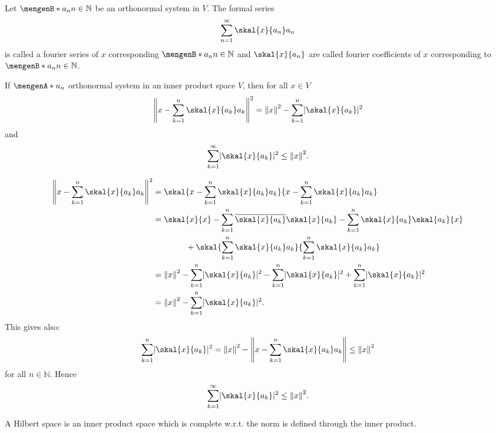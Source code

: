 \begin{definition}
	Let $\set[a_n]{n \in \mathbb{N}}$ be an orthonormal system in $V$. The formal series 
	\[
		\sum_{n=1}^{\infty} \skal{x}{a_n}a_n
	\]
	is called a fourier series of $x$ corresponding $\set[a_n]{n \in \mathbb{N}}$ and $\skal{x}{a_n}$ are called fourier coefficients of $x$ corresponding to $\set[a_n]{n \in \mathbb{N}}$. 
\end{definition}

\begin{theorem}
	If $\set{u_n}$ orthonormal system in an inner product space $V$, then for all $x \in V$
	\[
		\norm{x- \sum_{k=1}^{n} \skal{x}{a_k}a_k}^2 = \norm{x}^2 - \sum_{k=1}^{n} \abs{\skal{x}{a_k}}^2
	\]
	and 
	\[
		\sum_{k=1}^{\infty} \abs{\skal{x}{a_k}}^2 \leq \norm{x}^2.
	\]
\end{theorem}
\begin{beweis}
	\begin{align*}
		\norm{x- \sum_{k=1}^{n} \skal{x}{a_k}a_k}^2 &= \skal{x- \sum_{k=1}^{n} \skal{x}{a_k}a_k }{x - \sum_{k=1}^{n} \skal{x}{a_k}a_k} \\
		&= \skal{x}{x} - \sum_{k=1}^{n} \overline{\skal{x}{a_k}} \skal{x}{a_k} - \sum_{k=1}^{n} \skal{x}{a_k}\skal{a_k}{x} 
		\\ & \qquad \qquad + \skal{\sum_{k=1}^{n}\skal{x}{a_k}a_k}{\sum_{k=1}^{n}\skal{x}{a_k}a_k} \\
		& = \norm{x}^2 - \sum_{k=1}^{n} \abs{\skal{x}{a_k}}^2 - \sum_{k=1}^{n} \abs{\skal{x}{a_k}}^2 + \sum_{k=1}^{n}\abs{\skal{x}{a_k}}^2  \\
		& = \norm{x}^2 - \sum_{k=1}^{n} \abs{\skal{x}{a_k}}^2.
	\end{align*}
	This gives also:
	\[
		\sum_{k=1}^{n}\abs{\skal{x}{a_k}}^2 = \norm{x}^2 - \norm{x - \sum_{k=1}^{n} \skal{x}{a_k}a_k} \leq \norm{x}^2 
	\]
	for all $n \in \mathbb{N}$. Hence
	\[
		\sum_{k=1}^{\infty} \abs{\skal{x}{a_k}}^2 \leq \norm{x}^2.
	\]
\end{beweis}

\begin{definition}
	A Hilbert space is an inner product space which is complete w.r.t. the norm is defined through the inner product.
\end{definition}

